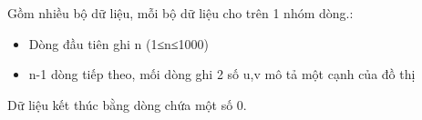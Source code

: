 Gồm nhiều bộ dữ liệu, mỗi bộ dữ liệu cho trên 1 nhóm dòng.:  
\begin{itemize}
	\item     Dòng đầu tiên ghi n (1≤n≤1000)   
	\item     n-1 dòng tiếp theo, mối dòng ghi 2 số u,v mô tả một cạnh của đồ thị   
\end{itemize}

   Dữ liệu kết thúc bằng dòng chứa một số 0.
